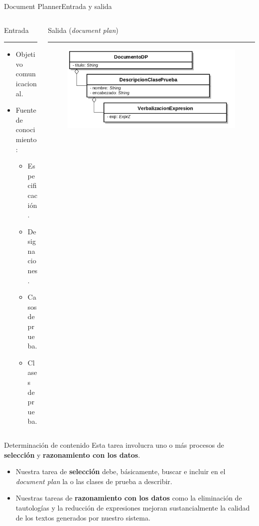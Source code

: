 \documentclass[pdf]{beamer}
\begin{document}
\begin{frame}[fragile]{Document Planner}{Entrada y salida}
\begin{columns}[T] %
\begin{column}{.50\textwidth}
  Entrada
  \rule{\linewidth}{1pt}
  
  \begin{itemize}
  \item Objetivo comunicacional.
  
  \item{Fuente de conocimiento: \\
    \begin{itemize}
      \item Especificación.
      \item Designaciones.
      \item Casos de prueba.
      \item Clases de prueba.
    \end{itemize}
  }
  
\end{itemize}

\end{column}%
\hfill%
\begin{column}{.50\textwidth}
Salida (\textit{document plan})

\rule{\linewidth}{1pt}

  \begin{figure}[H]
    \centering
    \includegraphics[scale=0.13]{img/document_plan.png}
  \end{figure}
\end{column}%
\end{columns}
\end{frame}
                                
\begin{frame}{Determinación de contenido}{}
  Esta tarea involucra uno o más procesos de \textbf{selección} y \textbf{razonamiento con los datos}.
  \begin{itemize}
    \item Nuestra tarea de \textbf{selección} debe, básicamente, buscar e incluir en el \textit{document plan} la o las clases de prueba a describir.
    \item Nuestras tareas de \textbf{razonamiento con los datos} como la eliminación de tautologías y la reducción de expresiones mejoran sustancialmente la calidad de los textos generados por nuestro sistema.
  \end{itemize}
\end{frame}
                                
\end{document}
